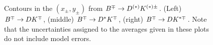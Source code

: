 \begin{figure}[htb]
\begin{center}
{    }
    \hfill
  \end{center}
  \vspace{-0.8cm}
  \caption{
    Contours in the $(x_\pm, y_\pm)$ from $B^\mp \to D^{(*)}K^{(*)\pm}$.
    (Left) $B^\mp \to DK^\mp$, 
    (middle) $B^\mp \to D^*K^\mp$,
    (right) $B^\mp \to DK^{*\mp}$.
    Note that the uncertainties assigned to the averages given in these plots
    do not include model errors.        
  }
  \label{fig:cp_uta:cus:dalitz_2d}
\end{figure}

